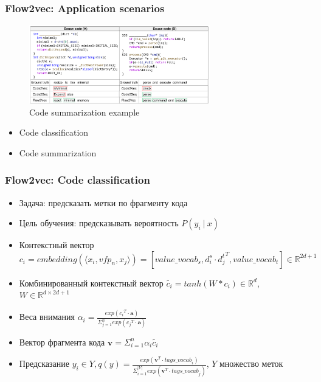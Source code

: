 \documentclass[xcolor=table,english]{beamer}
\begin{document}
\begin{frame}[fragile] \frametitle{Flow2vec: Application scenarios}
    \begin{minipage}[m]{\linewidth}
        \begin{figure}
            \centering
            \includegraphics[width=0.7\textwidth]{figures/code_summarization_example.png}
            \caption{Code summarization example}
            \label{fig:code_summ_ex}
        \end{figure}
    \end{minipage}\hfill
    \begin{minipage}[m]{\linewidth}
        \begin{itemize}
            \item Code classification
            \item Code summarization
        \end{itemize}
    \end{minipage}
\end{frame}

\begin{frame}[fragile] \frametitle{Flow2vec: Code classification}
    \begin{itemize}
        \item Задача: предсказать метки по фрагменту кода
        \item Цель обучения: предсказывать вероятность $P(y_i~|~x)$
        \item Контекстный вектор $c_i = embedding(\langle x_i, vfp_n, x_j \rangle) = [value\_vocab_s, d_i^s \cdot {d_j^t}^T, value\_vocab_t] \in \mathbb{R}^{2d + 1}$
        \item Комбинированный контекстный вектор $\tilde{c_i} = tanh(W * c_i) \in \mathbb{R}^d$, $W \in \mathbb{R}^{d \times 2d+1}$
        \item Веса внимания $\alpha_i = \frac{exp({c_i}^T \cdot \textbf{a})}{\Sigma_{j=1}^n exp({c_j}^T \cdot \textbf{a})}$
        \item Вектор фрагмента кода $\textbf{v} = \Sigma_{i=1}^n \alpha_i \tilde{c_i}$
        \item Предсказание $y_i \in Y, q(y) = \frac{exp(\textbf{v}^T \cdot \textit{tags\_vocab}_i)}{\Sigma_{i=1}^{|Y|} exp(\textbf{v}^T \cdot \textit{tags\_vocab}_j) }$, $Y$ множество меток
    \end{itemize}
\end{frame}
\end{document}
